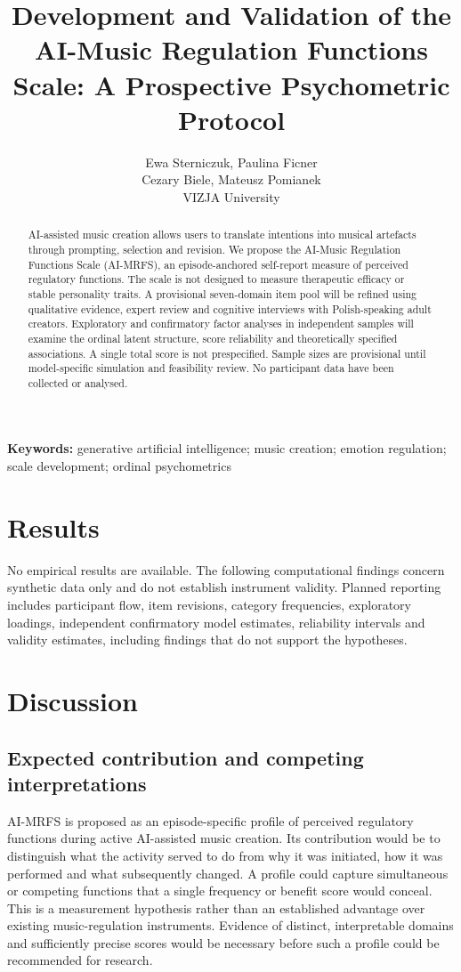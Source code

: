 \documentclass[11pt,a4paper]{article}
\title{Development and Validation of the AI-Music Regulation Functions Scale: A Prospective Psychometric Protocol}
\author{Ewa Sterniczuk, Paulina Ficner\\Cezary Biele, Mateusz Pomianek\\[0.4em]\small VIZJA University}
\date{}
\begin{document}
\maketitle
\begin{abstract}
AI-assisted music creation allows users to translate intentions into musical artefacts through prompting, selection and revision. We propose the AI-Music Regulation Functions Scale (AI-MRFS), an episode-anchored self-report measure of perceived regulatory functions. The scale is not designed to measure therapeutic efficacy or stable personality traits. A provisional seven-domain item pool will be refined using qualitative evidence, expert review and cognitive interviews with Polish-speaking adult creators. Exploratory and confirmatory factor analyses in independent samples will examine the ordinal latent structure, score reliability and theoretically specified associations. A single total score is not prespecified. Sample sizes are provisional until model-specific simulation and feasibility review. No participant data have been collected or analysed.
\end{abstract}
\noindent\textbf{Keywords:} generative artificial intelligence; music creation; emotion regulation; scale development; ordinal psychometrics



\section{Results}
No empirical results are available. The following computational findings concern synthetic data only and do not establish instrument validity. Planned reporting includes participant flow, item revisions, category frequencies, exploratory loadings, independent confirmatory model estimates, reliability intervals and validity estimates, including findings that do not support the hypotheses.

\section{Discussion}
\subsection{Expected contribution and competing interpretations}
AI-MRFS is proposed as an episode-specific profile of perceived regulatory functions during active AI-assisted music creation. Its contribution would be to distinguish what the activity served to do from why it was initiated, how it was performed and what subsequently changed. A profile could capture simultaneous or competing functions that a single frequency or benefit score would conceal. This is a measurement hypothesis rather than an established advantage over existing music-regulation instruments. Evidence of distinct, interpretable domains and sufficiently precise scores would be necessary before such a profile could be recommended for research.
\end{document}
